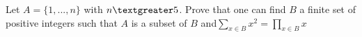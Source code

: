 Let $A = \{1,...,n\}$ with $n \textgreater 5$. Prove that one can find $B$ a finite set of positive integers such that $A$ is a subset of $B$ and$\displaystyle\sum_{x \in B} x^2 = \displaystyle\prod_{x \in B} x$